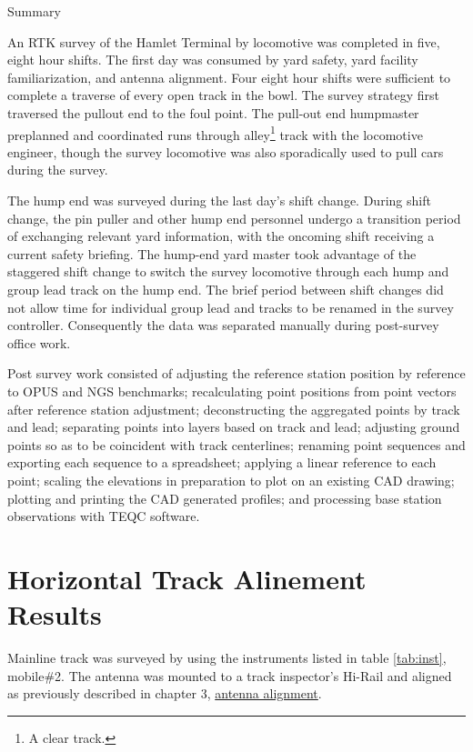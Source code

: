 Summary

An RTK survey of the Hamlet Terminal by locomotive was completed in five, eight hour shifts. The first day was consumed by yard safety, yard facility familiarization, and antenna alignment. Four eight hour shifts were sufficient to complete a traverse of every open track in the bowl. The survey strategy first traversed the pullout end to the foul point. The pull-out end humpmaster preplanned and coordinated runs through alley\footnote{A clear track.} track with the locomotive engineer, though the survey locomotive was also sporadically used to pull cars during the survey.

The hump end was surveyed during the last day's shift change. During shift change, the pin puller and other hump end personnel undergo a transition period of exchanging relevant yard information, with the oncoming shift receiving a current safety briefing. The hump-end yard master took advantage of the staggered shift change to switch the survey locomotive through each hump and group lead track on the hump end. The brief period between shift changes did not allow time for individual group lead and tracks to be renamed in the survey controller. Consequently the data was separated manually during post-survey office work.

Post survey work consisted of adjusting the reference station position by reference to OPUS and NGS benchmarks; recalculating point positions from point vectors after reference station adjustment; deconstructing the aggregated points by track and lead; separating points into layers based on track and lead; adjusting ground points so as to be coincident with track centerlines; renaming point sequences and exporting each sequence to a spreadsheet; applying a linear reference to each point; scaling the elevations in preparation to plot on an existing CAD drawing; plotting and printing the CAD generated profiles; and processing base station observations with TEQC software.

\section{Horizontal Track Alinement Results}

Mainline track was surveyed by using the instruments listed in table \ref{tab:inst}, mobile\#2. The antenna was mounted to a track inspector's Hi-Rail and aligned as previously described in chapter 3, \hyperref[Antenna Alignment]{antenna alignment}.

